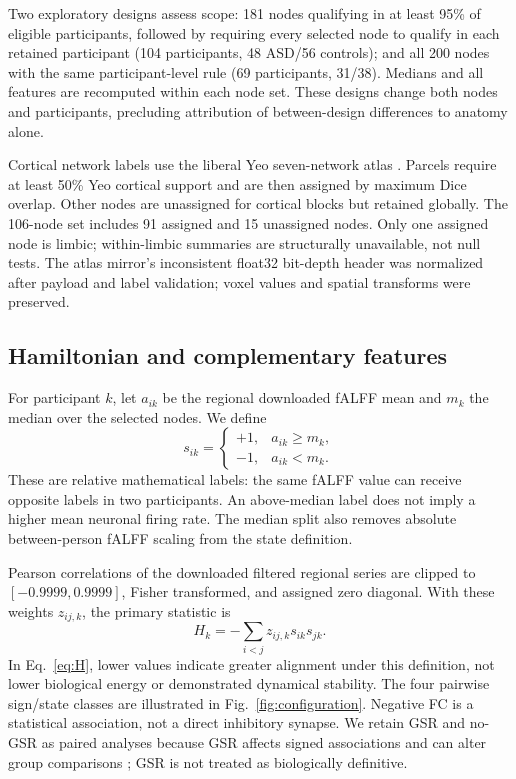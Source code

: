 \documentclass[10pt,letterpaper]{article}
\begin{document}
Two exploratory designs assess scope: 181 nodes qualifying in at least 95\% of
eligible participants, followed by requiring every selected node to qualify in
each retained participant (104 participants, 48 ASD/56 controls); and all 200 nodes
with the same participant-level rule (69 participants, 31/38). Medians and all
features are recomputed within each node set. These designs change both nodes and
participants, precluding attribution of between-design differences to anatomy alone.

Cortical network labels use the liberal Yeo seven-network atlas \cite{Yeo2011}.
Parcels require at least 50\% Yeo cortical support and are then assigned by maximum
Dice overlap. Other nodes are unassigned for cortical blocks but retained globally.
The 106-node set includes 91 assigned and 15 unassigned nodes. Only one assigned
node is limbic; within-limbic summaries are structurally unavailable, not null tests.
The atlas mirror's inconsistent float32 bit-depth header was normalized after
payload and label validation; voxel values and spatial transforms were preserved.

\subsection*{Hamiltonian and complementary features}
For participant $k$, let $a_{ik}$ be the regional downloaded fALFF mean and
$m_k$ the median over the selected nodes. We define
\begin{equation}
s_{ik}=\begin{cases}+1,&a_{ik}\geq m_k,\\-1,&a_{ik}<m_k.\end{cases}
\end{equation}
These are relative mathematical labels: the same fALFF value can receive opposite
labels in two participants. An above-median label does not imply a higher mean
neuronal firing rate. The median split also removes absolute between-person
fALFF scaling from the state definition.

Pearson correlations of the downloaded filtered regional series are clipped to
$[-0.9999,0.9999]$, Fisher transformed, and assigned zero diagonal. With these
weights $z_{ij,k}$, the primary statistic is
\begin{equation}
H_k=-\sum_{i<j}z_{ij,k}s_{ik}s_{jk}.\label{eq:H}
\end{equation}
In Eq.~\ref{eq:H}, lower values indicate greater alignment under this definition,
not lower biological
energy or demonstrated dynamical stability. The four pairwise sign/state classes
are illustrated in Fig.~\ref{fig:configuration}. Negative FC is a statistical association,
not a direct inhibitory synapse. We retain GSR and no-GSR as paired analyses because
GSR affects signed associations and can alter group comparisons \cite{Gotts2013perilsRevision}; GSR is not treated as biologically definitive.
\end{document}
